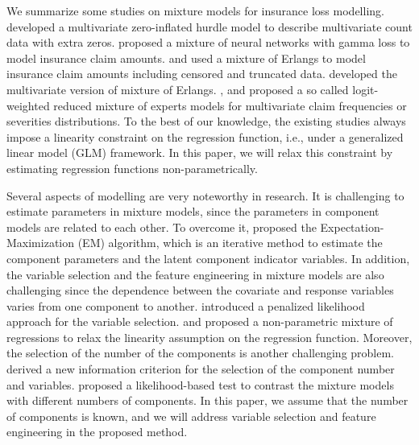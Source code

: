 \documentclass[11pt]{article}
\numberwithin{equation}{section}
\begin{document}
We summarize some studies on mixture models for insurance loss modelling.
\citet{zhang2020type, zhang2022new} developed a multivariate zero-inflated hurdle model to describe multivariate count data with extra zeros.
\citet{delong2021gamma} proposed a mixture of neural networks with gamma loss to model insurance claim amounts.
\citet{lee2010modeling} and \citet{verbelen2015fitting} used a mixture of Erlangs to model insurance claim amounts including censored and truncated data.
\citet{lee2012modeling} developed the multivariate version of mixture of Erlangs.
\citet{fung2019class2}, \citet{fung2019class} and \citet{tseung2021lrmoe} proposed a so called logit-weighted reduced mixture of experts models for multivariate claim frequencies or severities distributions.
To the best of our knowledge, the existing studies always impose a linearity constraint on the regression function, i.e., under a generalized linear model (GLM) framework.
In this paper, we will relax this constraint by estimating regression functions non-parametrically.

Several aspects of modelling are very noteworthy in research. It is challenging to estimate parameters in mixture models, since the parameters in component models are related to each other.
To overcome it,  \citet{dempster1977maximum} proposed the Expectation-Maximization (EM) algorithm, which is an iterative method to estimate the component parameters and the latent component indicator variables. 
In addition, the variable selection and the feature engineering in mixture models are also challenging since the dependence between the covariate and response variables varies from one component to another.  
\citet{khalili2007variable} introduced a penalized likelihood approach for the variable selection.
\citet{huang2012mixture} and \citet{huang2013nonparametric} proposed a non-parametric mixture of regressions to relax the linearity assumption on the regression function.
Moreover, the selection of the number of the components is another challenging problem.
\citet{naik2007extending} derived a new information criterion for the selection of the component number and variables.
\citet{kasahara2015testing} proposed a likelihood-based test to contrast  the mixture models with different numbers of components. 
In this paper, we assume that the number of components is known, and we will address variable selection and feature engineering in the proposed method.
\end{document}
